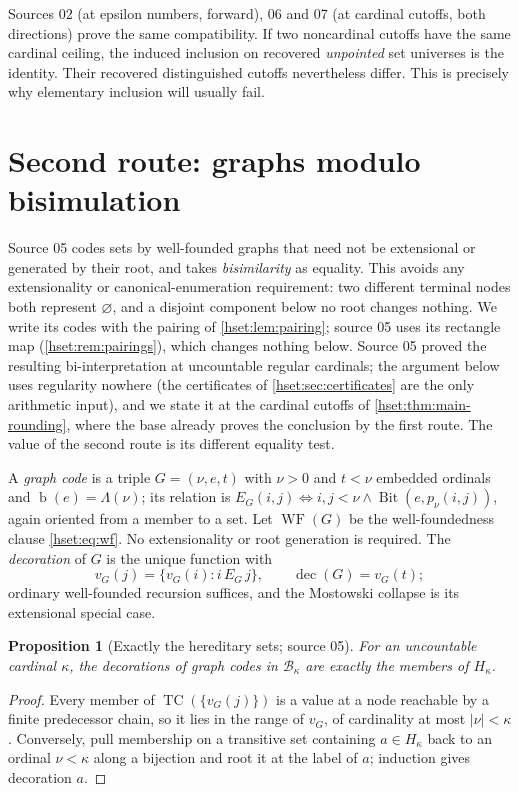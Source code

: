 \documentclass[11pt,letterpaper]{article}
\newtheorem{proposition}[proposition]{Proposition}\aliascntresetthe{proposition}
\theoremstyle{definition}
\theoremstyle{remark}
\newcommand{\bd}{\operatorname{b}}
\newcommand{\TC}{\operatorname{TC}}
\newcommand{\B}{\mathcal B}
\newcommand{\Bit}{\operatorname{Bit}}
\newcommand{\card}[1]{\lvert#1\rvert}
\begin{document}
Sources 02 (at epsilon numbers, forward), 06 and 07 (at cardinal cutoffs,
both directions) prove the same compatibility. If two noncardinal cutoffs have
the same cardinal ceiling, the induced inclusion on recovered
\emph{unpointed} set universes is the identity. Their recovered distinguished
cutoffs nevertheless differ. This is precisely why elementary inclusion will
usually fail.

\section{Second route: graphs modulo bisimulation}
\label{hset:sec:bisim}

Source 05 codes sets by well-founded graphs that need not be extensional or
generated by their root, and takes \emph{bisimilarity} as equality. This avoids
any extensionality or canonical-enumeration requirement: two different
terminal nodes both represent $\varnothing$, and a disjoint component below no
root changes nothing. We write its codes with the pairing of
\cref{hset:lem:pairing}; source 05 uses its rectangle map
(\cref{hset:rem:pairings}), which changes nothing below. Source 05 proved the
resulting bi-interpretation at
uncountable regular cardinals; the argument below uses regularity nowhere (the
certificates of \cref{hset:sec:certificates} are the only arithmetic input), and
we state it at the cardinal cutoffs of \cref{hset:thm:main-rounding}, where the
base already proves the conclusion by the first route. The value of the second
route is its different equality test.

A \emph{graph code} is a triple $G=(\nu,e,t)$ with $\nu>0$ and $t<\nu$ embedded
ordinals and $\bd(e)=\Lambda(\nu)$; its relation is
$E_G(i,j)\iff i,j<\nu\land\Bit(e,p_\nu(i,j))$, again oriented from a member to
a set. Let $\operatorname{WF}(G)$ be the well-foundedness clause
\eqref{hset:eq:wf}. No extensionality or root generation is required. The
\emph{decoration} of $G$ is the unique function with
\[
 v_G(j)=\{v_G(i):i\,E_G\,j\},\qquad\operatorname{dec}(G)=v_G(t);
\]
ordinary well-founded recursion suffices, and the Mostowski collapse is its
extensional special case.

\begin{proposition}[Exactly the hereditary sets; source 05]
\label{hset:prop:bisim-range}
For an uncountable cardinal $\kappa$, the decorations of graph codes in
$\B_\kappa$ are exactly the members of $H_\kappa$.
\end{proposition}
\begin{proof}
Every member of $\TC(\{v_G(j)\})$ is a value at a node reachable by a finite
predecessor chain, so it lies in the range of $v_G$, of cardinality at most
$\card\nu<\kappa$. Conversely, pull membership on a transitive set containing
$a\in H_\kappa$ back to an ordinal $\nu<\kappa$ along a bijection and root it at
the label of $a$; induction gives decoration $a$.
\end{proof}
\end{document}

